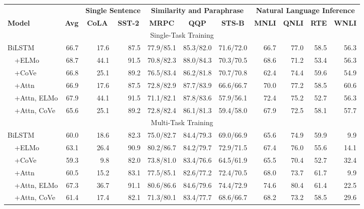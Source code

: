 \documentclass{article} \usepackage{iclr2019_conference,times}
\begin{document}
\begin{table*}[t]
\centering \fontsize{8.4}{10.1}\selectfont \setlength{\tabcolsep}{0.5em}
\begin{tabular}{lrrrrrrrrrr}

\toprule

&& \multicolumn{2}{c}{\textbf{Single Sentence}} & \multicolumn{3}{c}{\textbf{Similarity and Paraphrase}} & \multicolumn{4}{c}{\textbf{Natural Language Inference}} \\
\textbf{Model} & \multicolumn{1}{c}{\textbf{Avg}} & \multicolumn{1}{c}{\textbf{CoLA}} & \multicolumn{1}{c}{\textbf{SST-2}} & \multicolumn{1}{c}{\textbf{MRPC}} & \multicolumn{1}{c}{\textbf{QQP}} & \multicolumn{1}{c}{\textbf{STS-B}} & \multicolumn{1}{c}{\textbf{MNLI}} & \multicolumn{1}{c}{\textbf{QNLI}} & \multicolumn{1}{c}{\textbf{RTE}} & \multicolumn{1}{c}{\textbf{WNLI}} \\
\midrule
\multicolumn{11}{c}{Single-Task Training} \\
\midrule

BiLSTM & 66.7 & 17.6 & 87.5 & 77.9/85.1 & 85.3/82.0 & 71.6/72.0 & 66.7 & 77.0 & 58.5 & 56.3 \\

~~+ELMo & 68.7 & 44.1 & 91.5 & 70.8/82.3 & 88.0/84.3 & 70.3/70.5 & 68.6 & 71.2 & 53.4 & 56.3 \\

~~+CoVe & 66.8 & 25.1 & 89.2 & 76.5/83.4 & 86.2/81.8 & 70.7/70.8 & 62.4 & 74.4 & 59.6 & 54.9 \\

~~+Attn & 66.9 & 17.6 & 87.5 & 72.8/82.9 & 87.7/83.9 & 66.6/66.7 & 70.0 & 77.2 & 58.5 & 60.6 \\

~~+Attn, ELMo & 67.9 & 44.1 & 91.5 & 71.1/82.1 & 87.8/83.6 & 57.9/56.1 & 72.4 & 75.2 & 52.7 & 56.3 \\

~~+Attn, CoVe & 65.6 & 25.1 & 89.2 & 72.8/82.4 & 86.1/81.3 & 59.4/58.0 & 67.9 & 72.5 & 58.1 & 57.7 \\

\midrule
\multicolumn{11}{c}{Multi-Task Training} \\
\midrule

BiLSTM  & 60.0 & 18.6 & 82.3 & 75.0/82.7 & 84.4/79.3 & 69.0/66.9 & 65.6 & 74.9 & 59.9 & 9.9 \\ 
~~+ELMo & 63.1 & 26.4 & 90.9 & 80.2/86.7 & 84.2/79.7 & 72.9/71.5 & 67.4 & 76.0 & 55.6 & 14.1 \\
~~+CoVe & 59.3 & 9.8 & 82.0 & 73.8/81.0 & 83.4/76.6 & 64.5/61.9 & 65.5 & 70.4 & 52.7 & 32.4 \\
~~+Attn & 60.5 & 15.2 & 83.1 & 77.5/85.1 & 82.6/77.2 & 72.4/70.5 & 68.0 & 73.7 & 61.7 & 9.9 \\
~~+Attn, ELMo & 67.3 &  36.7 & 91.1 & 80.6/86.6 & 84.6/79.6 & 74.4/72.9 & 74.6 & 80.4 & 61.4 & 22.5 \\
~~+Attn, CoVe & 61.4 & 17.4 & 82.1 & 71.3/80.1 & 83.4/77.7 & 68.6/66.7 & 68.2 & 73.2 & 58.5 & 29.6 \\


\end{tabular}
\end{table*}
\end{document}
